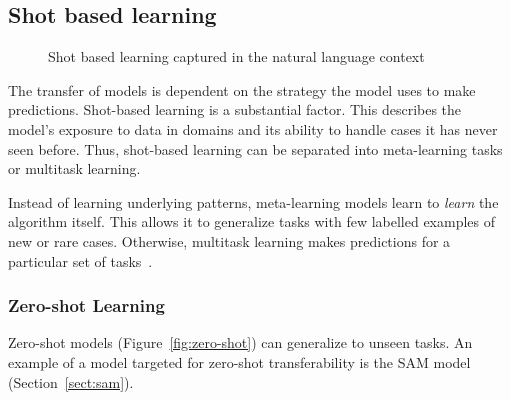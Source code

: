 \documentclass[11pt,twoside]{report}
\begin{document}
\subsection{Shot based learning}

\begin{figure}[H]
  \centering
  \caption{Shot based learning captured in the natural language context~\cite{openaishotbasedlearning}}
\end{figure}

The transfer of models is dependent on the strategy the model uses to make predictions. Shot-based learning is a substantial factor. This describes the model's exposure to data in domains and its ability to handle cases it has never seen before. Thus, shot-based learning can be separated into meta-learning tasks or multitask learning. 

Instead of learning underlying patterns, meta-learning models learn to \textit{learn} the algorithm itself. This allows it to generalize tasks with few labelled examples of new or rare cases. Otherwise, multitask learning makes predictions for a particular set of tasks~\cite{deep-learning-book}.

\subsubsection{Zero-shot Learning}\label{sect:zero-shot-learning}

Zero-shot models (Figure~\ref{fig:zero-shot}) can generalize to unseen tasks. An example of a model targeted for zero-shot transferability is the SAM model (Section~\ref{sect:sam}).
\end{document}
